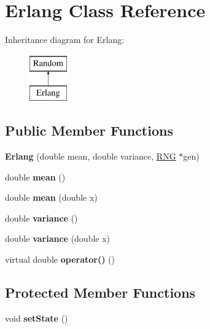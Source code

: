 \hypertarget{classErlang}{}\section{Erlang Class Reference}
\label{classErlang}
Inheritance diagram for Erlang\+:\begin{figure}[H]
\begin{center}
\leavevmode
\includegraphics[height=2.000000cm]{classErlang}
\end{center}
\end{figure}
\subsection*{Public Member Functions}
\begin{DoxyCompactItemize}
\item 
\mbox{\label{classErlang_a34ccf900ca24bfd260d920553ddecc3e}} 
{\bfseries Erlang} (double mean, double variance, \hyperlink{classRNG}{R\+NG} $\ast$gen)
\item 
\mbox{\label{classErlang_a0f8346175fa4243dcbb0f6f3556019e6}} 
double {\bfseries mean} ()
\item 
\mbox{\label{classErlang_a60eecf9a38105ae12fed90187d6c8255}} 
double {\bfseries mean} (double x)
\item 
\mbox{\label{classErlang_a30540e58fa1b9c4c94326717082eedd8}} 
double {\bfseries variance} ()
\item 
\mbox{\label{classErlang_ad7b9a7b37c023a2da0d3e3533cf10bce}} 
double {\bfseries variance} (double x)
\item 
\mbox{\label{classErlang_a0205a7995b67fe080b9284d275d1ec5e}} 
virtual double {\bfseries operator()} ()
\end{DoxyCompactItemize}
\subsection*{Protected Member Functions}
\begin{DoxyCompactItemize}
\item 
\mbox{\label{classErlang_a0910e81d2b37c0f167cbb40eab66ca94}} 
void {\bfseries set\+State} ()
\end{DoxyCompactItemize}
